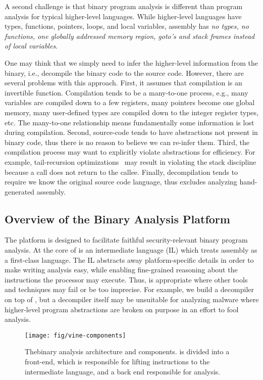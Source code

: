 A second challenge is that binary program analysis is different than
program analysis for typical higher-level languages. While
higher-level languages have types, functions, pointers, loops, and
local variables, assembly has \emph{no types, no functions, one
  globally addressed memory region, goto's and stack frames instead of
  local variables}.  


One may think that we simply need to infer the higher-level
information from the binary, i.e., decompile the binary code to the
source code. However, there are several problems with this
approach. First, it assumes that compilation is an invertible
function.  Compilation tends to be a many-to-one process, e.g., many
variables are compiled down to a few registers, many pointers become
one global memory, many user-defined types are compiled down to the
integer register types, etc. The many-to-one relationship means
fundamentally some information is lost during compilation.  Second,
source-code tends to have abstractions not present in binary code,
thus there is no reason to believe we can re-infer them.  Third, the
compilation process may want to explicitly violate abstractions for
efficiency. For example, tail-recursion
optimizations~\cite{muchnick:1997} may result in violating the stack
discipline because a call does not return to the callee. Finally,
decompilation tends to require we know the original source code
language, thus excludes analyzing hand-generated assembly.




\subsection{Overview of the \bap Binary Analysis Platform}

The \bap platform is designed to facilitate faithful
security-relevant binary program analysis.  At the core of \bap is an
intermediate language (IL) which treats assembly as a first-class
language. The IL abstracts away platform-specific details in order to
make writing analysis easy, while enabling fine-grained reasoning
about the instructions the processor may execute.  Thus, \bap is
appropriate where other tools and techniques may fail or be too
imprecise.  For example, we build a decompiler on top of \bap, but a
decompiler itself may be unsuitable for analyzing malware where
higher-level program abstractions are broken on purpose in an effort
to fool analysis.

\begin{figure}
\texttt{[image: fig/vine-components]}
\caption{The\bap binary analysis architecture and components. \bap
  is divided into a front-end, which is responsible for lifting
  instructions to the \bap intermediate language, and a back end
  responsible for analysis.}
\label{fig:vine-components}
\end{figure}

